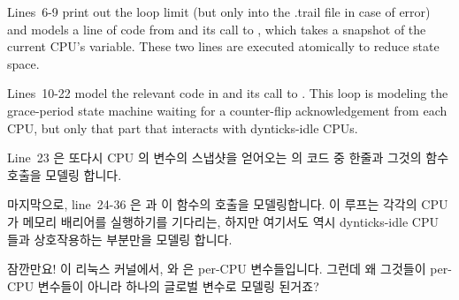 Lines~6-9 print out the loop limit (but only into the .trail file
in case of error) and models a line of code
from  and its call to
, which takes a
snapshot of the current CPU's 
variable.
These two lines are executed atomically to reduce state space.

Lines~10-22 model the relevant code in
 and its call to
.
This loop is modeling the grace-period state machine waiting for
a counter-flip acknowledgement from each CPU, but only that part
that interacts with dynticks-idle CPUs.
\fi

Line~23 은 또다시 CPU 의  변수의 스냅샷을
얻어오는  의 코드 중 한줄과 그것의
 함수 호출을 모델링 합니다.

마지막으로, line~24-36 은  과 이 함수의
 호출을 모델링합니다.
이 루프는 각각의 CPU 가 메모리 배리어를 실행하기를 기다리는, 하지만 여기서도
역시 dynticks-idle CPU 들과 상호작용하는 부분만을 모델링 합니다.
\iffalse

Line~23 models a line from \co{rcu_try_flip_waitzero()}
and its call to \co{dyntick_save_progress_counter()}, again
taking a snapshot of the CPU's \co{dynticks_progress_counter}
variable.

Finally, lines~24-36 model the relevant code in
\co{rcu_try_flip_waitack()} and its call to
\co{rcu_try_flip_waitack_needed()}.
This loop is modeling the grace-period state-machine waiting for
each CPU to execute a memory barrier, but again only that part
that interacts with dynticks-idle CPUs.
\fi

\QuickQuiz{}
	잠깐만요!
	이 리눅스 커널에서,  와
	 은 per-CPU 변수들입니다.
	그런데 왜 그것들이 per-CPU 변수들이 아니라 하나의 글로벌 변수로 모델링
	된거죠?
	\iffalse

